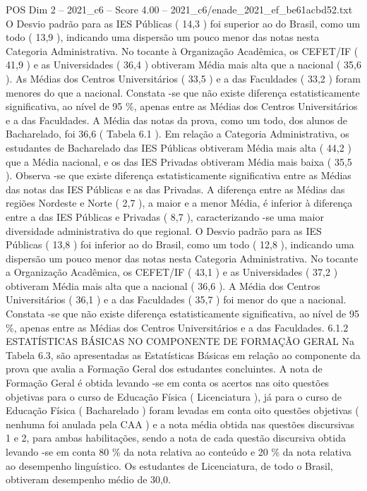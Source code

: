 \begin{textsample}{POS Dim 2 – 2021\_c6 – Score 4.00 – 2021\_c6/enade\_2021\_ef\_be61acbd52.txt}
O Desvio padrão para as IES Públicas ( 14,3 ) foi superior ao do Brasil, como um todo ( 13,9 ), indicando uma dispersão um pouco menor das notas nesta Categoria Administrativa.
No tocante à Organização Acadêmica, os CEFET/IF ( 41,9 ) e as Universidades ( 36,4 ) obtiveram Média mais alta que a nacional ( 35,6 ).
As Médias dos Centros Universitários ( 33,5 ) e a das Faculdades ( 33,2 ) foram menores do que a nacional.
Constata -se que não existe diferença estatisticamente significativa, ao nível de 95 \%, apenas entre as Médias dos Centros Universitários e a das Faculdades.
A Média das notas da prova, como um todo, dos alunos de Bacharelado, foi 36,6 ( Tabela 6.1 ).
Em relação a Categoria Administrativa, os estudantes de Bacharelado das IES Públicas obtiveram Média mais alta ( 44,2 ) que a Média nacional, e os das IES Privadas obtiveram Média mais baixa ( 35,5 ).
Observa -se que existe diferença estatisticamente significativa entre as Médias das notas das IES Públicas e as das Privadas.
A diferença entre as Médias das regiões Nordeste e Norte ( 2,7 ), a maior e a menor Média, é inferior à diferença entre a das IES Públicas e Privadas ( 8,7 ), caracterizando -se uma maior diversidade administrativa do que regional.
O Desvio padrão para as IES Públicas ( 13,8 ) foi inferior ao do Brasil, como um todo ( 12,8 ), indicando uma dispersão um pouco menor das notas nesta Categoria Administrativa.
No tocante a Organização Acadêmica, os CEFET/IF ( 43,1 ) e as Universidades ( 37,2 ) obtiveram Média mais alta que a nacional ( 36,6 ).
A Média dos Centros Universitários ( 36,1 ) e a das Faculdades ( 35,7 ) foi menor do que a nacional.
Constata -se que não existe diferença estatisticamente significativa, ao nível de 95 \%, apenas entre as Médias dos Centros Universitários e a das Faculdades. 6.1.2 ESTATÍSTICAS BÁSICAS NO COMPONENTE DE FORMAÇÃO GERAL Na Tabela 6.3, são apresentadas as Estatísticas Básicas em relação ao componente da prova que avalia a Formação Geral dos estudantes concluintes.
A nota de Formação Geral é obtida levando -se em conta os acertos nas oito questões objetivas para o curso de Educação Física ( Licenciatura ), já para o curso de Educação Física ( Bacharelado ) foram levadas em conta oito questões objetivas ( nenhuma foi anulada pela CAA ) e a nota média obtida nas questões discursivas 1 e 2, para ambas habilitações, sendo a nota de cada questão discursiva obtida levando -se em conta 80 \% da nota relativa ao conteúdo e 20 \% da nota relativa ao desempenho linguístico.
Os estudantes de Licenciatura, de todo o Brasil, obtiveram desempenho médio de 30,0.

\end{textsample}
